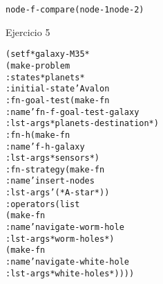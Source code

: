 \begin{aibox}{\function}
\begin{alltt}
node-f-compare (node-1 node-2)



\end{alltt}
\end{aibox}

\begin{aibox}{\examples}
\begin{alltt}

\end{alltt}
\end{aibox}

\begin{aibox}{\comments}
Ejercicio 5

\end{aibox}

\begin{aibox}{\pseudocode}
\begin{alltt}

\end{alltt}
\end{aibox}

\begin{aibox}{\code}
\begin{alltt}

(setf *galaxy-M35*
	(make-problem
		:states *planets*
		:initial-state 'Avalon
		:fn-goal-test (make-fn
                  		:name 'fn-f-goal-test-galaxy
                    	:lst-args *planets-destination*)
		:fn-h (make-fn
          		:name 'f-h-galaxy
            	:lst-args *sensors*)
		:fn-strategy (make-fn
                 		:name 'insert-nodes
                   		:lst-args '(*A-star*))
		:operators (list
					(make-fn
						:name 'navigate-worm-hole 
						:lst-args *worm-holes*)
					(make-fn
						:name 'navigate-white-hole
						:lst-args *white-holes*))))



\end{alltt}
\end{aibox}
